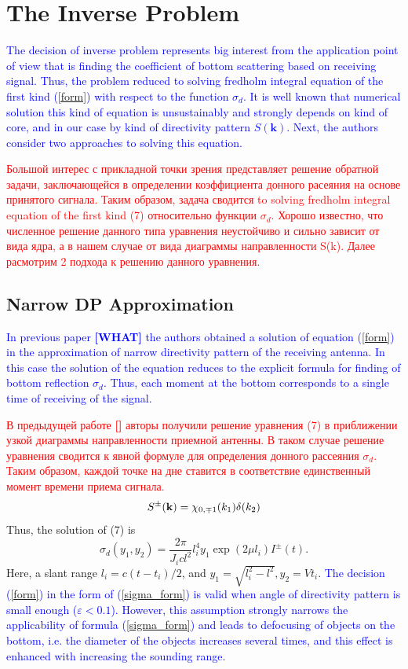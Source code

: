 \documentclass{procDDs}
\begin{document}
\section{The Inverse Problem}
\textcolor{blue}{
The decision of inverse problem represents big interest from the application point of view that is finding the coefficient of bottom scattering based on receiving signal. Thus, the problem reduced to solving fredholm integral equation of the first kind (\ref{form}) with respect to the function $\sigma_d$. It is well known that numerical solution this kind of equation is unsustainably and strongly depends on kind of core, and in our case by kind of directivity pattern $S(\textbf{k})$. Next, the authors consider two approaches to solving this equation.}

\textcolor{red}{Большой интерес с прикладной точки зрения представляет решение обратной задачи, заключающейся в определении коэффициента донного расеяния на основе принятого сигнала. Таким образом, задача сводится to solving fredholm integral equation of the first kind (7) относительно функции $\sigma_d$. Хорошо известно, что численное решение данного типа уравнения неустойчиво и сильно зависит от вида ядра, а в нашем случае от вида диаграммы направленности S(k). Далее расмотрим 2 подхода к решению данного уравнения.}
\subsection{Narrow DP Approximation}
\textcolor{blue}{
In previous paper \textbf{[WHAT]} the authors obtained a solution of equation (\ref{form}) in the approximation of narrow directivity pattern of the receiving antenna. In this case the solution of the equation reduces to the explicit formula for finding of bottom reflection $\sigma_d$. Thus, each moment at the bottom corresponds to a single time of receiving of the signal.}

\textcolor{red}{В предыдущей работе \textbf{[]} авторы получили решение уравнения (7) в приближении узкой диаграммы направленности приемной антенны. В таком случае решение уравнения сводится к явной формуле для определения донного рассеяния $\sigma_d$. Таким образом, каждой точке на дне ставится в соответствие единственный момент времени приема сигнала. }
\begin{equation}
S^{\pm}(\mathbf{k}) = \chi_{0,\mp1}(k_1)\delta(k_2)
\end{equation}
Thus, the solution of (7) is
\begin{equation}
	\label{sigma_form}
	\sigma_d \left( y_1, y_2 \right) = \frac{2\pi}{J_icl^2} l_i^4 y_1 \exp(2\mu l_i)I^\pm(t).
\end{equation}
Here, a slant range $l_i=c(t-t_i)/2$, and $y_1=\sqrt{l_i^2-l^2}, y_2=Vt_i$.
\textcolor{blue}{The decision (\ref{form}) in the form of (\ref{sigma_form}) is valid when angle of directivity pattern is small enough ($\varepsilon<0.1$). However, this assumption strongly narrows the applicability of formula (\ref{sigma_form}) and leads to defocusing of objects on the bottom, i.e. the diameter of the objects increases several times, and this effect is enhanced with increasing the sounding range.}
\end{document}
